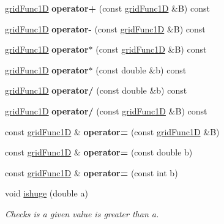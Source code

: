 \begin{DoxyCompactItemize}
\mbox{\label{classgridFunc1D_a121a7d446c2cfbfbbfc685ccc70c3e30}} 
\hyperlink{classgridFunc1D}{grid\+Func1D} {\bfseries operator+} (const \hyperlink{classgridFunc1D}{grid\+Func1D} \&B) const
\item 
\mbox{\label{classgridFunc1D_a18dc29bb1beca6f09ab507ced3f5ff50}} 
\hyperlink{classgridFunc1D}{grid\+Func1D} {\bfseries operator-\/} (const \hyperlink{classgridFunc1D}{grid\+Func1D} \&B) const
\item 
\mbox{\label{classgridFunc1D_a6143c22e1c52a94b7618a9478e44b6c9}} 
\hyperlink{classgridFunc1D}{grid\+Func1D} {\bfseries operator$\ast$} (const \hyperlink{classgridFunc1D}{grid\+Func1D} \&B) const
\item 
\mbox{\label{classgridFunc1D_a4415608c844ce3098e09df36c31ad6c5}} 
\hyperlink{classgridFunc1D}{grid\+Func1D} {\bfseries operator$\ast$} (const double \&b) const
\item 
\mbox{\label{classgridFunc1D_ae21f476b7a1c40a4fcf013e20efef31a}} 
\hyperlink{classgridFunc1D}{grid\+Func1D} {\bfseries operator/} (const double \&b) const
\item 
\mbox{\label{classgridFunc1D_a3c852d13b415f5c167a50bca0ea14124}} 
\hyperlink{classgridFunc1D}{grid\+Func1D} {\bfseries operator/} (const \hyperlink{classgridFunc1D}{grid\+Func1D} \&B) const
\item 
\mbox{\label{classgridFunc1D_a0bf1365b51d3f71b36877cd7ce7aaa6a}} 
const \hyperlink{classgridFunc1D}{grid\+Func1D} \& {\bfseries operator=} (const \hyperlink{classgridFunc1D}{grid\+Func1D} \&B)
\item 
\mbox{\label{classgridFunc1D_ac9c3bd3b43873d9e0ba174e1010d5188}} 
const \hyperlink{classgridFunc1D}{grid\+Func1D} \& {\bfseries operator=} (const double b)
\item 
\mbox{\label{classgridFunc1D_a72cf64cc9788b269c3830a1a1c6a55f2}} 
const \hyperlink{classgridFunc1D}{grid\+Func1D} \& {\bfseries operator=} (const int b)
\item 
\mbox{\label{classgridFunc1D_a6eb98fafdb29757160e503415e49a0ca}} 
void \hyperlink{classgridFunc1D_a6eb98fafdb29757160e503415e49a0ca}{ishuge} (double a)
\begin{DoxyCompactList}\small\item\em Checks is a given value is greater than a. \end{DoxyCompactList}\end{DoxyCompactItemize}
